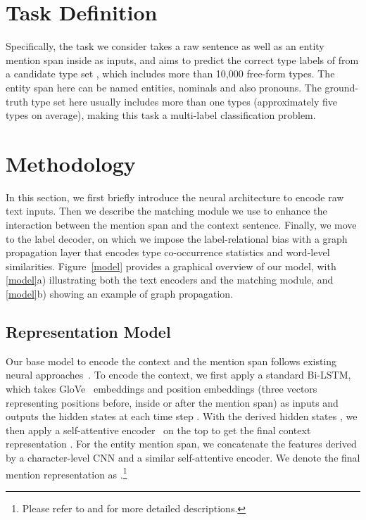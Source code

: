 \documentclass[11pt,a4paper]{article}
\begin{document}
\section{Task Definition}
Specifically, the task we consider takes a raw sentence  as well as an entity mention span  inside  as inputs, and aims to predict the correct type labels  of  from a candidate type set , which includes more than 10,000 free-form types. The entity span  here can be named entities, nominals and also pronouns. The ground-truth type set  here usually includes more than one types (approximately five types on average), making this task a multi-label classification problem.


\section{Methodology}
In this section, we first briefly introduce the neural architecture to encode raw text inputs. Then we describe the matching module we use to enhance the interaction between the mention span and the context sentence. Finally, we move to the label decoder, on which we impose the label-relational bias with a graph propagation layer that encodes type co-occurrence statistics and word-level similarities. Figure~\ref{model} provides a graphical overview of our model, with \ref{model}a) illustrating both the text encoders and the matching module, and \ref{model}b) showing an example of graph propagation.

\subsection{Representation Model}
Our base model to encode the context and the mention span follows existing neural approaches~\cite{shimaoka2016attentive,xu2018neural,choi2018ultra}. To encode the context, we first apply a standard Bi-LSTM, which takes GloVe~\cite{pennington2014glove} embeddings and position embeddings (three vectors representing positions before, inside or after the mention span) as inputs and outputs the hidden states at each time step . With the derived hidden states , we then apply a self-attentive encoder~\cite{mccann2017learned} on the top to get the final context representation . For the entity mention span, we concatenate the features derived by a character-level CNN and a similar self-attentive encoder. We denote the final mention representation as .\footnote{Please refer to \cite{shimaoka2016neural} and \cite{choi2018ultra} for more detailed descriptions.} 
\end{document}
